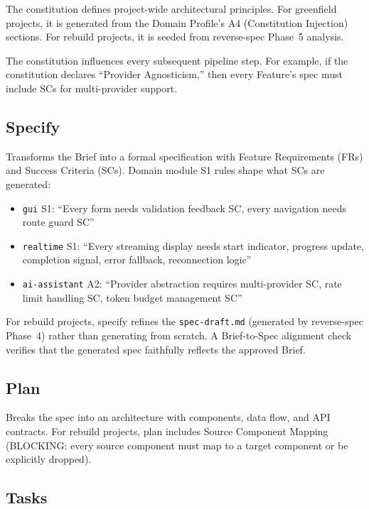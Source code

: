 \documentclass[11pt,a4paper,openright,twoside]{report}
\newcommand{\file}[1]{\texttt{#1}}
\begin{document}
The constitution defines project-wide architectural principles. For greenfield projects, it is generated from the Domain Profile's A4 (Constitution Injection) sections. For rebuild projects, it is seeded from reverse-spec Phase~5 analysis.

The constitution influences every subsequent pipeline step. For example, if the constitution declares ``Provider Agnosticism,'' then every Feature's spec must include SCs for multi-provider support.

\subsection{Specify}

Transforms the Brief into a formal specification with Feature Requirements (FRs) and Success Criteria (SCs). Domain module S1 rules shape what SCs are generated:

\begin{itemize}
  \item \texttt{gui} S1: ``Every form needs validation feedback SC, every navigation needs route guard SC''
  \item \texttt{realtime} S1: ``Every streaming display needs start indicator, progress update, completion signal, error fallback, reconnection logic''
  \item \texttt{ai-assistant} A2: ``Provider abstraction requires multi-provider SC, rate limit handling SC, token budget management SC''
\end{itemize}

For rebuild projects, specify refines the \file{spec-draft.md} (generated by reverse-spec Phase~4) rather than generating from scratch. A Brief-to-Spec alignment check verifies that the generated spec faithfully reflects the approved Brief.

\subsection{Plan}

Breaks the spec into an architecture with components, data flow, and API contracts. For rebuild projects, plan includes Source Component Mapping (BLOCKING: every source component must map to a target component or be explicitly dropped).

\subsection{Tasks}
\end{document}
